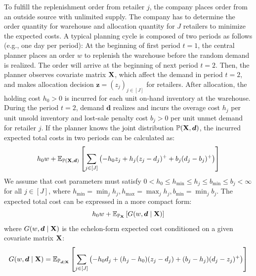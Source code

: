 \documentclass[mnsc, nonblindrev]{informswp}
\newcommand{\1}[1]{\mathds{1}{\left(#1\right)}}
\begin{document}
To fulfill the replenishment order from retailer $j$, the company places order from an outside source with unlimited supply. The company has to determine the order quantity for warehouse and allocation quantity for $J$ retailers to minimize the expected costs. A typical planning cycle is composed of two periods as follows (e.g., one day per period): At the beginning of first period $t=1$, the central planner places an order $w$ to replenish the warehouse before the random demand is realized. The order will arrive at the beginning of next period $t=2$. Then, the planner observes covariate matrix ${\mathbf{X}}$, which affect the demand in period $t=2$, and makes allocation decision $\bm z = (z_j)_{j \in [J]}$ for retailers. After allocation, the holding cost $h_0>0$ is incurred for each unit on-hand inventory at the warehouse. During the period $t=2$, demand $\bm d$ realizes and incurs the overage cost $h_j$ per unit unsold inventory and lost-sale penalty cost $b_j > 0$ per unit unmet demand for retailer $j$. If the planner knows the joint distribution $\mathbb{P}{({\mathbf{X}}, \bm d)}$, the incurred expected total costs in two periods can be calculated as:
\[
h_0 w + \mathbb{E}_{\mathbb{P}{({\mathbf{X}}, \bm d)}} \left[ { \sum_{j \in [J]} \left(-h_0 z_j + h_j (z_j - d_j)^+ + b_j (d_j -b_j)^+ \right)} \right]
\]
We assume that cost parameters must satisfy $0 < h_0 \leq h_{\min} \leq h_j \leq b_{\min} \leq b_j < \infty $ for all $j \in [J]$, where $ h_{\min} = \min_j h_j,h_{\max} = \max_j h_j, b_{\min} =  \min_j b_j$. 
The expected total cost can be expressed in a more compact form:
\[
h_0 w + \mathbb{E}_{\mathbb{P}{_{{\mathbf{X}}}}} \left[ G(w, \bm d \mid {\mathbf{X}} ) \right]
\]
where $G(w, \bm d \mid {\mathbf{X}})$ is the echelon-form expected cost conditioned on a given covariate matrix ${\mathbf{X}}$:
\[
G(w, \bm d \mid {\mathbf{X}}) = \mathbb{E}_{\mathbb{P}_{\bm d \mid {\mathbf{X}}}} \left[ 
\sum_{j \in [J]} \left( 
    -h_0 d_j + (h_j - h_0) (z_j -d_j)+(b_j - h_j)(d_j-z_j)^+
\right)
 \right]
\]
\end{document}

